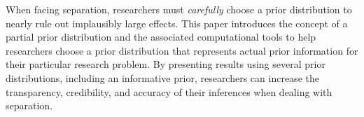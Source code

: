 \documentclass[12pt]{article}
\begin{document}
When facing separation, researchers must \emph{carefully} choose a prior distribution to nearly rule out implausibly large effects. 
This paper introduces the concept of a partial prior distribution and the associated computational tools to help researchers choose a prior distribution that represents actual prior information for their particular research problem. 
By presenting results using several prior distributions, including an informative prior, researchers can increase the transparency, credibility, and accuracy of their inferences when dealing with separation.

\singlespace


%
\end{document}
